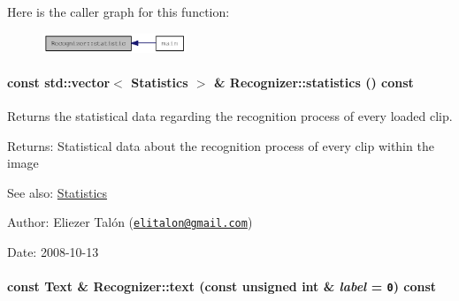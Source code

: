 Here is the caller graph for this function:\nopagebreak
\begin{figure}[H]
\begin{center}
\leavevmode
\includegraphics[width=122pt]{class_recognizer_b941b1ad42c3bacb3c829acf7fc689de_icgraph}
\end{center}
\end{figure}
\hypertarget{class_recognizer_8b38356d2741969e67cd6b4f507897ba}{
\paragraph[{statistics}]{\setlength{\rightskip}{0pt plus 5cm}const std::vector$<$ {\bf Statistics} $>$ \& Recognizer::statistics () const}\hfill}
\label{class_recognizer_8b38356d2741969e67cd6b4f507897ba}


Returns the statistical data regarding the recognition process of every loaded clip. 

\begin{Desc}
\item[Returns:]Statistical data about the recognition process of every clip within the image\end{Desc}
\begin{Desc}
\item[See also:]\hyperlink{class_statistics}{Statistics}\end{Desc}
\begin{Desc}
\item[Author:]Eliezer Talón (\href{mailto:elitalon@gmail.com}{\tt elitalon@gmail.com}) \end{Desc}
\begin{Desc}
\item[Date:]2008-10-13 \end{Desc}
\hypertarget{class_recognizer_c5d20b511888a60a6c1a81c0a4206ec2}{
\paragraph[{text}]{\setlength{\rightskip}{0pt plus 5cm}const {\bf Text} \& Recognizer::text (const unsigned int \& {\em label} = {\tt 0}) const}\hfill}
\label{class_recognizer_c5d20b511888a60a6c1a81c0a4206ec2}


